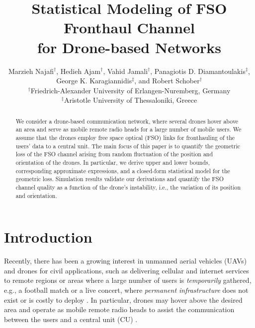 \documentclass[conference]{IEEEtran}
\begin{document}

\title{Statistical Modeling of FSO Fronthaul Channel \\ for Drone-based Networks
\vspace{-0.3cm}}
\author{Marzieh Najafi$^{\dag}$, Hedieh Ajam$^{\dag}$, Vahid Jamali$^{\dag}$,  Panagiotis D. Diamantoulakis$^{\ddag}$,\\ George K. Karagiannidis$^{\ddag}$, and Robert Schober$^{\dag}$\\  
$^{\dag}$Friedrich-Alexander University of Erlangen-Nuremberg, Germany \\
$^{\ddag}$Aristotle University of Thessaloniki, Greece
\vspace{-0.2cm}}


\maketitle
\begin{abstract}
We consider a drone-based communication network, where several drones hover above an area and serve as mobile remote radio heads for a large number of mobile users. We assume that the drones employ free space optical (FSO) links for fronthauling of the users' data to a central unit. The main focus of this paper is to quantify the geometric loss of the FSO channel arising from random fluctuation of the position and orientation of the drones. In particular, we derive upper and lower bounds, corresponding approximate expressions, and a closed-form statistical model for the geometric loss. Simulation results validate our derivations and quantify the FSO channel quality as a function of the drone's instability, i.e., the  variation of its position and orientation.
\end{abstract}


\section{Introduction}
Recently, there has been a growing interest in unmanned aerial vehicles (UAVs) and drones for civil applications, such as delivering cellular and internet services to remote regions or areas where a large number of users is \textit{temporarily} gathered, e.g., a football match or a live concert, where \textit{permanent infrastructure} does not exist or is costly to deploy \cite{Alouini_Drone,Data_Collection_UAV_FSO}. 
In particular, drones may hover above the desired area and operate as mobile remote radio heads to assist the communication between the users and a central unit (CU) \cite{Alouini_Drone}. 
\end{document}
